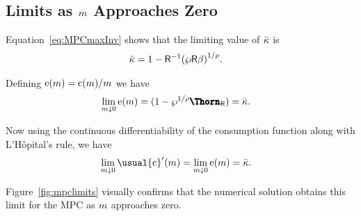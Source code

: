 \documentclass[BufferStockTheory]{subfiles}
\begin{document}
\begin{comment}
  Of course, the constraint never becomes irrelevant if human wealth is
  infinite.  We ruled out infinite human wealth at the beginning of this
  section by assuming $\Rfree> \PermGroFac$.  If this finite human wealth
  condition does not hold, it is possible to show that for any finite
  horizon consumer the marginal propensity to consume approaches the
  finite-horizon perfect foresight MPC as wealth approaches infinity.
  However, as the horizon gets longer, the perfect foresight MPC
  approaches zero.  It can be shown therefore that the limiting MPC for
  the converged consumption function approaches (but never reaches)
  zero.  (This is why we chose $\MPCminmin=0$ if the \FHWC~fails
  in the proofs above.)
\end{comment}

\hypertarget{LimitsAsmtToZero}{}
\subsection{Limits as \texorpdfstring{$m$}{m} Approaches Zero}\label{subsec:LimitsAsmtToZero}

Equation~\eqref{eq:MPCmaxInv} shows that the limiting value of
${\bar{\kappa}}$ is
\begin{align*}
  {\bar{\kappa}}  & = 1-{{\mathsf{R}}}^{-1}{({\wp}  {\mathsf{R}}\beta)}^{1/{\rho}}.
\end{align*}

Defining $\mathrm{e}(m)=\mathrm{c}(m)/m$ we have
\begin{align*}
  \lim_{m \downarrow 0} \eFunc(\mNrm)  & = (1-\pZero^{1/\CRRA}\RPFac) = \MPCmax .
\end{align*}

Now using the continuous differentiability of the consumption function along with L'H\^opital's rule, we have
\begin{align*}
  \lim_{m \downarrow 0} \usual{\cFunc}^{\prime}(\mNrm)  & = \lim_{m \downarrow 0}
                                                          \eFunc(\mNrm) = \MPCmax.
\end{align*}

Figure~\ref{fig:mpclimits} visually confirms that the numerical solution obtains this limit for the MPC as $m$ approaches zero.
\end{document}
